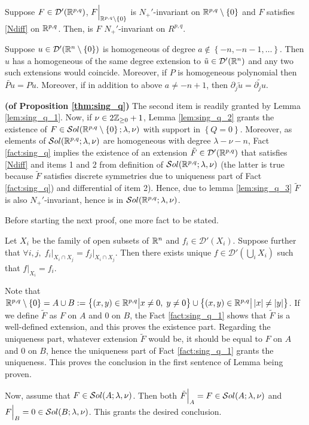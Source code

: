 \documentclass[10pt]{article} %
\newcommand{\D}{\mathcal{D}}
\theoremstyle{definition}
\theoremstyle{remark}
\begin{document}
\begin{mylem}
	Suppose $F\in\D'(\R^{p,q})$, $F\Big|_{\R^{p,q}\setminus\left\{ 0 \right\}}$ is $N_+'$-invariant on $\R^{p,q}
	\setminus\left\{ 0 \right\}$ and $F$ satisfies \eqref{Ndiff} on $\R^{p,q}$. Then, is $F$ $N_{+}'$-invariant
	on $R^{p,q}$.
	\label{lem:sing_q_4}
\end{mylem}
\begin{myfact}{\bf\cite[thm 3.2.3]{hormander1983analysis}}\newline
	Suppose $u\in\D'(\R^n\setminus\left\{ 0 \right\})$ is homogeneous of degree $a\notin\left\{ -n,-n-1,\dots \right\}$.
	Then $u$ has a homogeneous of the same degree extension to $\tilde{u}\in\D'(\R^n)$ and any two such extensions would coincide.
	Moreover, if $P$ is homogeneous polynomial then $\tilde{Pu}=P\tilde{u}$. Moreover, if in addition to above $a\neq -n+1$,
	then $\partial_j\tilde{u}=\widetilde{\partial_ju}$.
	\label{fact:sing_q}
\end{myfact}
\begin{myproof}{\bf (of Proposition \ref{thm:sing_q})}\newline
	The second item is readily granted by Lemma \ref{lem:sing_q_1}. Now, if $\nu\in2\Z_{\geq0}+1$, Lemma \ref{lem:sing_q_2}
	grants the existence of $F\in\sol[\R^{p,q}\setminus\left\{ 0 \right\}]$ with support in $\left\{ Q=0 \right\}$.
	Moreover, as elements of $\sol$ are homogeneous with degree $\lambda-\nu-n$, Fact 
	\ref{fact:sing_q}
	implies the existence of an extension $\tilde{F}\in\D'(\R^{p,q})$ that satisfies \eqref{Ndiff} and items 1 and 2
	from definition of $\sol$ (the latter is true because $\tilde{F}$ satisfies
	discrete symmetries due to uniqueness part of Fact \ref{fact:sing_q}) and differential of item 2).
	Hence, due to lemma \ref{lem:sing_q_3} $\tilde{F}$ is also $N_+'$-invariant, hence is in $\sol$.
\end{myproof}
Before starting the next proof, one more fact to be stated.
\begin{myfact}
	Let $X_i$ be the family of open subsets of $\R^n$ and $f_i\in\D'(X_i)$. Suppose further
	that $\forall i,j,\;f_i\Big|_{X_i\cap X_j}=f_j\Big|_{X_i\cap X_j}$. Then there exists unique
	$f\in\D'(\bigcup_iX_i)$ such that $f\Big|_{X_i}=f_i$.
	\label{fact:sing_q_1}
\end{myfact}
\begin{myproof}
	Note that $\R^{p,q}\setminus\left\{ 0 \right\}=A\cup B:
	=\mysetn{(x,y)\in\R^{p,q}}{x\neq0,\;y\neq0}\cup\mysetn{(x,y)\in\R^{p,q}}
	{\myabs{x}\neq\myabs{y}}$. If we define $\tilde{F}$ as $F$ on $A$ and 0 on $B$, the Fact \ref{fact:sing_q_1}
	shows that $\tilde{F}$ is a well-defined extension, and this proves the existence part. Regarding the uniqueness part,
	whatever extension $\tilde{F}$ would be, it should be equal to $F$ on $A$ and 0 on $B$, hence the uniqueness part 
	of Fact \ref{fact:sing_q_1} grants the uniqueness. This proves the conclusion in the first sentence of Lemma being proven.

	Now, assume that $F\in\sol[A]$. Then both $\tilde{F}\Big|_A=F\in\sol[A]$ and
	$F\Big|_B=0\in\sol[B]$. This grants the desired conclusion.
\end{myproof}
\end{document}

